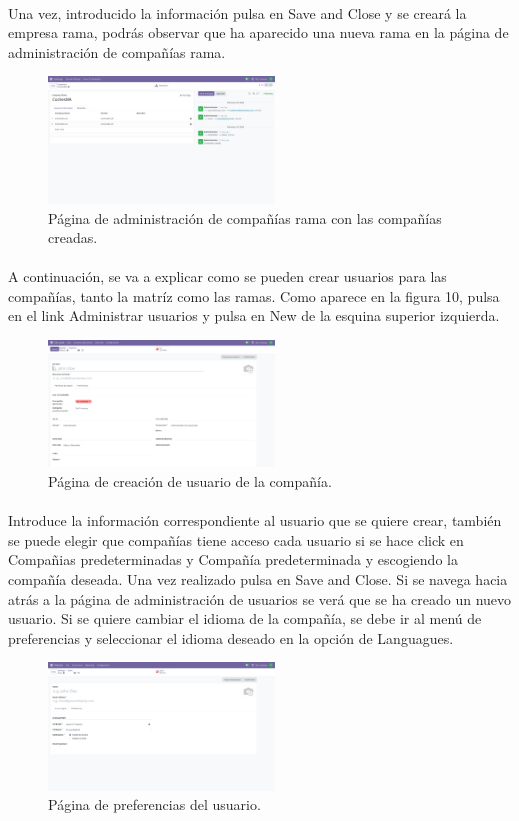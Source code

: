 \documentclass[paper=a4wide, fontsize=11pt]{report}	 %
\begin{document}
\paragraph{}
Una vez, introducido la información pulsa en Save and Close y se creará la empresa rama, podrás observar que ha aparecido una nueva rama en la página de administración de compañías rama.
\begin{figure}[h]
    \centering
    \includegraphics[width=6cm]{ramasCreadas.png}
    \caption{Página de administración de compañías rama con las compañías creadas.}
    \label{fig:faqs}
\end{figure}
\paragraph{}
A continuación, se va a explicar como se pueden crear usuarios para las compañías, tanto la matríz como las ramas. Como aparece en la figura 10, pulsa en el link Administrar usuarios y pulsa en New de la esquina superior izquierda. 
\begin{figure}[h]
    \centering
    \includegraphics[width=6cm]{adminUsuarios.png}
    \caption{Página de creación de usuario de la compañía.}
    \label{fig:faqs}
\end{figure}
\paragraph{}
Introduce la información correspondiente al usuario que se quiere crear, también se puede elegir que compañías tiene acceso cada usuario si se hace click en Compañias predeterminadas y Compañía predeterminada y escogiendo la compañía deseada. Una vez realizado pulsa en Save and Close. Si se navega hacia atrás a la página de administración de usuarios se verá que se ha creado un nuevo usuario.
Si se quiere cambiar el idioma de la compañía, se debe ir al menú de preferencias y seleccionar el idioma deseado en la opción de Languagues.
\newpage
\begin{figure}[h]
    \centering
    \includegraphics[width=6cm]{languageUsuario.png}
    \caption{Página de preferencias del usuario.}
    \label{fig:faqs}
\end{figure}
\end{document}
